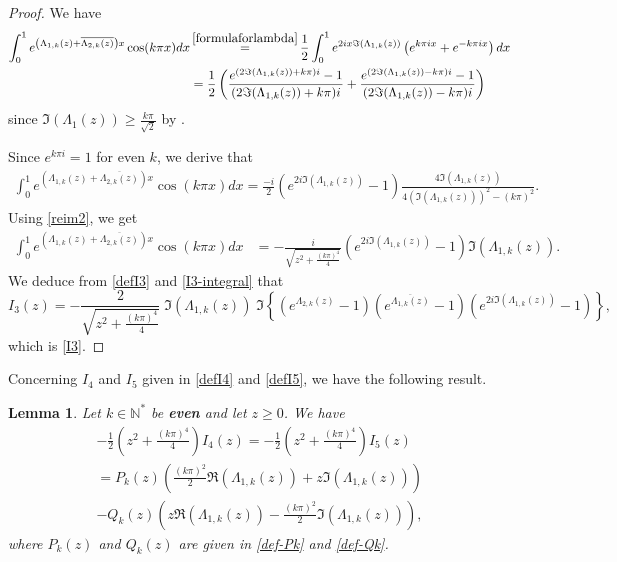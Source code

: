 \documentclass[11pt, reqno]{amsart}
\theoremstyle{plain}
\newtheorem{lemma}[thm]{Lemma}
\numberwithin{equation}{section}
\newcommand{\mN}{\mathbb{N}}
\begin{document}
\begin{proof}
We have    \begin{align*}
         \int_0^1  e^{\left(\Lambda_{1,k}(z) + \overline{\Lambda_{2,k}(z)} \right)x} \cos(k \pi x) dx & \mathop{=}^{\Cref{formulaforlambda}} \frac{1}{2} \int_0^1 e^{2i x \Im(\Lambda_{1,k}(z))} \left(e^{k \pi i x} + e^{- k \pi i x} \right)  dx \\
         &= \frac{1}{2} \left(\frac{e^{(2 \Im (\Lambda_{1,k}(z)) + k \pi)i} - 1}{(2 \Im (\Lambda_{1,k}(z)) + k \pi)i} + \frac{e^{(2 \Im (\Lambda_{1,k}(z)) - k \pi)i} - 1}{(2 \Im (\Lambda_{1,k}(z)) - k \pi)i} \right) 
    \end{align*}
since  $\Im(\Lambda_1(z)) \geq \frac{k \pi}{\sqrt{2}}$ by . 
    
Since $e^{k \pi i} = 1$ for even $k$, we derive that 
     \begin{align*}
         \int_0^1  e^{\left(\Lambda_{1,k}(z) + \overline{\Lambda_{2,k}(z)} \right)x} \cos(k \pi x) dx 
  = \frac{-i}{2} \left(e^{2 i \Im (\Lambda_{1,k}(z)) } - 1 \right) \frac{4 \Im (\Lambda_{1,k}(z))}{4 (\Im (\Lambda_{1,k}(z)))^2 - (k \pi)^2}. 
    \end{align*}
Using \eqref{reim2}, we get
      \begin{align}	\label{I3-integral}
       \int_0^1  e^{\left(\Lambda_{1,k}(z) + \overline{\Lambda_{2,k}(z)} \right)x} \cos(k \pi x) dx &=  - \frac{i}{\sqrt{z^2 + \frac{(k \pi)^4}{4}}} \left(e^{2 i \Im (\Lambda_{1,k}(z)) } - 1 \right) \Im (\Lambda_{1,k}(z)). 
      \end{align}
 We deduce from \eqref{defI3} and \eqref{I3-integral} that
    $$
        I_3(z) 
        = - \frac{2}{\sqrt{z^2 + \frac{(k \pi)^4}{4}}} \; \Im (\Lambda_{1,k}(z)) \; \Im \left\{ \left(e^{\Lambda_{2,k}(z)} - 1 \right) \left( e^{\overline{\Lambda_{1,k}(z)}} - 1 \right) \left(e^{2 i \Im (\Lambda_{1,k}(z))} - 1 \right) \right\},
    $$
  which is \eqref{I3}. 
    \end{proof}
  
  Concerning $I_4$ and $I_5$ given in \eqref{defI4} and \eqref{defI5}, we have the following result. 
  
\begin{lemma} \label{lem-I4I5} Let $k \in \mN^*$ be {\bf even} and let $z \ge 0$. We have
\begin{multline}	\label{I4=I5}
- \frac{1}{2} \left(z^2 + \frac{(k \pi)^4}{4} \right) I_4(z)  = - \frac{1}{2} \left(z^2 + \frac{(k \pi)^4}{4} \right) I_5(z) 
\\[6pt]
=  P_k (z) \left( \frac{(k \pi)^2}{2}\Re (\Lambda_{1,k}(z)) + z \Im (\Lambda_{1,k}(z)) \right) \\
 -  Q_k(z) \left(z\Re (\Lambda_{1,k}(z))  - \frac{(k \pi)^2}{2} \Im (\Lambda_{1,k}(z)) \right) ,
\end{multline}
where $P_k(z)$ and $Q_k(z)$ are given in \eqref{def-Pk} and \eqref{def-Qk}. 
\end{lemma}
    
\end{document}
